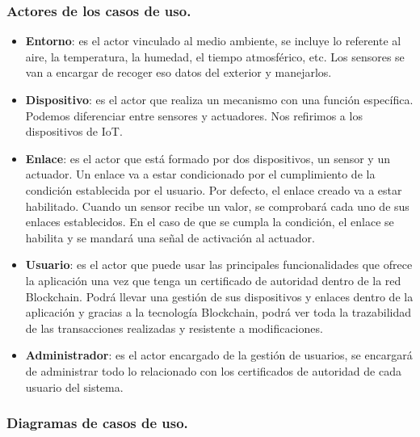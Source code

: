 \subsubsection{Actores de los casos de uso.}

\begin{itemize}
    \item \textbf{Entorno}: es el actor vinculado al medio ambiente, se incluye lo referente al aire, la temperatura, la 
    humedad, el tiempo atmosférico, etc. Los sensores se van a encargar de recoger eso datos del exterior y manejarlos.
    \item \textbf{Dispositivo}: es el actor que realiza un mecanismo con una función específica. Podemos diferenciar entre 
    sensores y actuadores. Nos refirimos a los dispositivos de IoT.
    \item \textbf{Enlace}: es el actor que está formado por dos dispositivos, un sensor y un actuador. Un enlace va a estar 
    condicionado por el cumplimiento de la condición establecida por el usuario. Por defecto, el enlace creado va a estar 
    habilitado. Cuando un sensor recibe un valor, se comprobará cada uno de sus enlaces establecidos. En el caso de que se 
    cumpla la condición, el enlace se habilita y se mandará una señal de activación al actuador.
    \item \textbf{Usuario}: es el actor que puede usar las principales funcionalidades que ofrece la aplicación una vez que 
    tenga un certificado de autoridad dentro de la red Blockchain. Podrá llevar una gestión de sus dispositivos y enlaces 
    dentro de la aplicación y gracias a la tecnología Blockchain, podrá ver toda la trazabilidad de las transacciones 
    realizadas y resistente a modificaciones.
    \item \textbf{Administrador}: es el actor encargado de la gestión de usuarios, se encargará de administrar todo lo 
    relacionado con los certificados de autoridad de cada usuario del sistema.
\end{itemize}

\subsubsection{Diagramas de casos de uso.}

